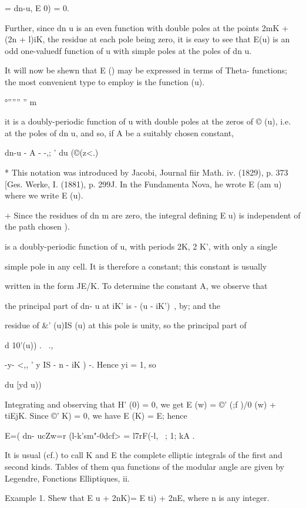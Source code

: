 = dn-u, E 0) = 0.

Further, since dn u is an even function with double poles at the
points 2mK + (2n + l)iK, the residue at each pole being zero, it is
easy to see that E(u) is an odd one-valuedf function of u with simple
poles at the poles of dn u.

It will now be shewn that E () may be expressed in terms of Theta-
functions; the most convenient type to employ is the function (u).

 °'''''' '' m %

it is a doubly-periodic function of u with double poles at the zeros
of © (u), i.e. at the poles of dn u, and so, if A be a suitably chosen
constant,

dn-u - A - -,; ' du (©(z<.)

* This notation was introduced by Jacobi, Journal fiir Math. iv.
(1829), p. 373 [Ges. Werke, I. (1881), p. 299J. In the Fundamenta
Nova, he wrote E (am u) where we write E (u).

+ Since the residues of dn m are zero, the integral defining E u) is
independent of the path chosen ).

%
%

is a doubly-periodic function of u, with periods 2K, 2 K', with only a
single

simple pole in any cell. It is therefore a constant; this constant is
usually

written in the form JE/K. To determine the constant A, we observe that

the principal part of dn- u at iK' is - (u - iK')~, by; and
the

residue of \&' (u)IS (u) at this pole is unity, so the principal part
of

d 10'(u)) . \ .,

-y- <,, ' y IS - n - iK ) -. Hence yi = 1, so

du [yd u))

Integrating and observing that H' (0) = 0, we get E (w) = ©' (;f )/0
(w) + tiEjK. Since ©' K) = 0, we have E (K) = E; hence

E=( dn- ucZw=r (l-k'sm"-0dcf> = l7rF(-l, ~; 1; kA .

It is usual (cf.) to call K and E the complete elliptic
integrals of the first and second kinds. Tables of them qua functions
of the modular angle are given by Legendre, Fonctions Elliptiques, ii.

Example 1. Shew that E u + 2nK)= E ti) + 2nE, where n is any integer.

